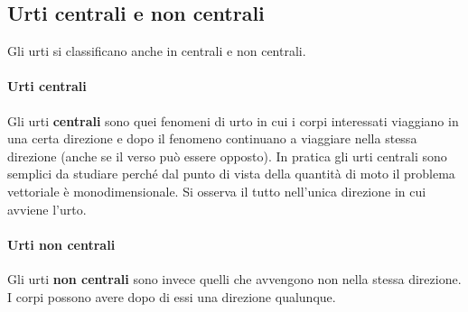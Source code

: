 \documentclass[10pt,a4paper]{book}
\begin{document}
\subsection{Urti centrali e non centrali}

Gli urti si classificano anche in centrali e non centrali.

\paragraph{Urti centrali} Gli urti \textbf{centrali} sono quei fenomeni di urto in cui i corpi interessati viaggiano in una certa direzione e dopo il fenomeno continuano a viaggiare nella stessa direzione (anche se il verso può essere opposto). In pratica gli urti centrali sono semplici da studiare perché dal punto di vista della quantità di moto il problema vettoriale è monodimensionale. Si osserva il tutto nell'unica direzione in cui avviene l'urto.

\paragraph{Urti non centrali} Gli urti \textbf{non centrali} sono invece quelli che avvengono non nella stessa direzione. I corpi possono avere dopo di essi una direzione qualunque.
\end{document}
